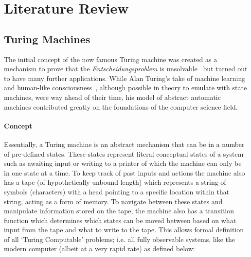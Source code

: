 \documentclass[12pt]{article}
\begin{document}
	\clearpage\section{Literature Review}\label{sec2}
		\subsection{Turing Machines}	
			The initial concept of the now famous Turing machine was created as a mechanism to prove that the \textit{Entscheidungsproblem} is unsolvable~\cite{Turing1936} but turned out to have many further applications. While Alan Turing's take of machine learning~\cite{Turing1969} %
			and human-like consciousness~\cite{Turing1950}, although possible in theory to emulate with state machines, were way ahead of their time, his model of abstract automatic machines contributed greatly on the foundations of the computer science field.
			
			\paragraph{Concept}
			Essentially, a Turing machine is an abstract mechanism that can be in a number of pre-defined states. These states represent literal conceptual states of a system such as awaiting input or writing to a printer of which the machine can only be in one state at a time. To keep track of past inputs and actions the machine also has a tape (of hypothetically unbound length) which represents a string of symbols (characters) with a head pointing to a specific location within that string, acting as a form of memory. To navigate between these states and manipulate information stored on the tape, the machine also has a transition function which determines which states can be moved between based on what input from the tape and what to write to the tape. This allows formal definition of all `Turing Computable' problems; i.e. all fully observable systems, like the modern computer (albeit at a very rapid rate) as defined below:
			
\end{document}
